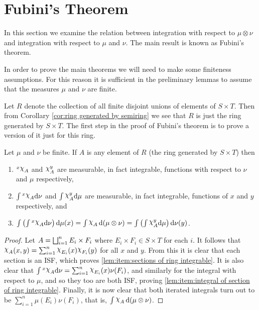 \section{Fubini's Theorem}

In this section we examine the relation between integration with respect to $\mu\otimes\nu$ and integration with respect to $\mu$ and $\nu$. The main result is known as Fubini's theorem.

In order to prove the main theorems we will need to make some finiteness assumptions. For this reason it is sufficient in the preliminary lemmas to assume that the measures $\mu$ and $\nu$ are finite.

Let $R$ denote the collection of all finite disjoint unions of elements of $S\times T$. Then from Corollary \ref{cor:ring generated by semiring} we see that $R$ is just the ring generated by $S\times T$. The first step in the proof of Fubini's theorem is to prove a version of it just for this ring.

\begin{lemma}
\label{lem:fubini finite union}
Let $\mu$ and $\nu$ be finite. If $A$ is any element of $R$ (the ring generated by $S\times T$) then
\begin{enumerate}[label=\arabic*),ref=\arabic*)]
    \item \label{lem:item:sections of ring integrable}
    $\xsec{\idf{A}}{x}$ and $\ysec{\idf{A}}{y}$ are measurable, in fact integrable, functions with respect to $\nu$ and $\mu$ respectively,

    \item \label{lem:item:integral of section of ring integrable}
    $\int\xsec{\idf{A}}{x}\dd\nu$ and $\int\ysec{\idf{A}}{y}\dd\mu$ are measurable, in fact integrable, functions of $x$ and $y$ respectively, and

    \item $\int\br{\int\xsec{\idf{A}}{x}\dd\nu}\dd\mu(x)=\int\idf{A}\dd(\mu\otimes\nu)=\int\br{\int\ysec{\idf{A}}{y}\dd\mu}\dd\nu(y)$.
\end{enumerate}
\end{lemma}

\begin{proof}
Let $A=\bigsqcup_{i=1}^nE_i\times F_i$ where $E_i\times F_i\in S\times T$ for each $i$. It follows that $\idf{A}(x,y)=\sum_{i=1}^n\idf{E_i}(x)\idf{F_i}(y)$ for all $x$ and $y$. From this it is clear that each section is an ISF, which proves \ref{lem:item:sections of ring integrable}. It is also clear that $\int\xsec{\idf{A}}{x}\dd\nu=\sum_{i=1}^n\idf{E_i}(x)\nu(F_i)$, and similarly for the integral with respect to $\mu$, and so they too are both ISF, proving \ref{lem:item:integral of section of ring integrable}. Finally, it is now clear that both iterated integrals turn out to be $\sum_{i=1}^n\mu(E_i)\nu(F_i)$, that is, $\int\idf{A}\dd(\mu\otimes\nu)$.
\end{proof}


